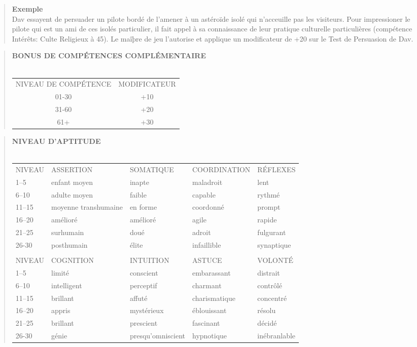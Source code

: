 \begin{quotation} \textbf{Exemple} \\ Dav essayent de persuader un pilote bordé de l'amener à un astéroïde isolé qui n'acceuille pas les visiteurs. Pour impressioner le pilote qui est un ami de ces isolés particulier, il fait appel à sa connaissance de leur pratique culturelle particulières (compétence Intérêts: Culte Religieux à 45). Le maîþre de jeu l'autorise et applique un modificateur de +20 sur le Test de Persuasion de Dav. \end{quotation} 

\begin{quotation} \textbf{BONUS DE COMPÉTENCES COMPLÉMENTAIRE} \\ \\ \begin{tabular}{cc} NIVEAU DE COMPÉTENCE &MODIFICATEUR\\ 01-30 &+10 \\ 31-60 &+20 \\ 61+ &+30 \\ \end{tabular} \end{quotation} 



\begin{quotation} \textbf{NIVEAU D'APTITUDE} \\ \\ \begin{tabular}{lllll} 

NIVEAU &ASSERTION &SOMATIQUE &COORDINATION &RÉFLEXES \\ 1–5 &enfant moyen &inapte &maladroit &lent\\ 6–10 &adulte moyen &faible &capable &rythmé \\ 11–15 &moyenne transhumaine &en forme &coordonné &prompt\\ 16–20 &amélioré &amélioré &agile &rapide \\ 21–25 &surhumain &doué &adroit &fulgurant \\ 26-30 &posthumain &élite &infaillible &synaptique \\ 





\\ NIVEAU &COGNITION &INTUITION &ASTUCE &VOLONTÉ \\ 1–5 &limité &conscient &embarassant &distrait\\ 6–10 &intelligent &perceptif &charmant &contrôlé \\ 11–15 &brillant &affuté &charismatique &concentré \\ 16–20 &appris &mystérieux &éblouissant &résolu \\ 21–25 &brillant &prescient &fascinant &décidé \\ 26-30 &génie &presqu'omniscient &hypnotique &inébranlable \\ \end{tabular} \end{quotation} 







